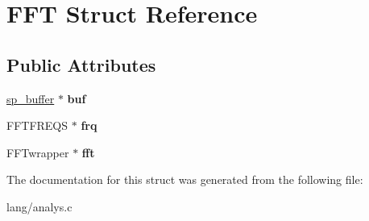 \hypertarget{structFFT}{}\section{F\+FT Struct Reference}
\label{structFFT}
\subsection*{Public Attributes}
\begin{DoxyCompactItemize}
\item 
\hypertarget{structFFT_ad5fe1cdd0bbb355f5dc0dd7373806595}{}\label{structFFT_ad5fe1cdd0bbb355f5dc0dd7373806595} 
\hyperlink{structsp__buffer}{sp\+\_\+buffer} $\ast$ {\bfseries buf}
\item 
\hypertarget{structFFT_a2171bdc774ca7a8a0394f73f726313f3}{}\label{structFFT_a2171bdc774ca7a8a0394f73f726313f3} 
F\+F\+T\+F\+R\+E\+QS $\ast$ {\bfseries frq}
\item 
\hypertarget{structFFT_af5b07dd2c181e7c2186ea53b76a8c68a}{}\label{structFFT_af5b07dd2c181e7c2186ea53b76a8c68a} 
F\+F\+Twrapper $\ast$ {\bfseries fft}
\end{DoxyCompactItemize}


The documentation for this struct was generated from the following file\+:\begin{DoxyCompactItemize}
\item 
lang/analys.\+c\end{DoxyCompactItemize}
